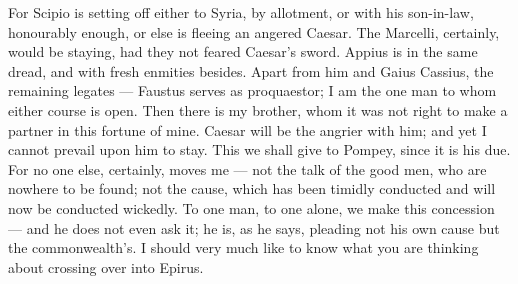  For Scipio is setting off either to Syria, by allotment, or with his son-in-law, honourably enough, or else is fleeing an angered Caesar. The Marcelli, certainly, would be staying, had they not feared Caesar's sword. Appius is in the same dread, and with fresh enmities besides. Apart from him and Gaius Cassius, the remaining legates --- Faustus serves as proquaestor; I am the one man to whom either course is open. Then there is my brother, whom it was not right to make a partner in this fortune of mine. Caesar will be the angrier with him; and yet I cannot prevail upon him to stay. This we shall give to Pompey, since it is his due. For no one else, certainly, moves me --- not the talk of the good men, who are nowhere to be found; not the cause, which has been timidly conducted and will now be conducted wickedly. To one man, to one alone, we make this concession --- and he does not even ask it; he is, as he says, pleading not his own cause but the commonwealth's. I should very much like to know what you are thinking about crossing over into Epirus.
